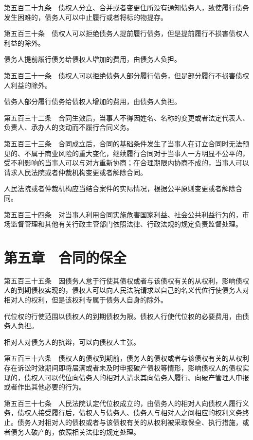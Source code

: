 \documentclass[UTF8,12pt,a4paper]{ctexbook}
\begin{document}
第五百二十九条　债权人分立、合并或者变更住所没有通知债务人，致使履行债务发生困难的，债务人可以中止履行或者将标的物提存。

第五百三十条　债权人可以拒绝债务人提前履行债务，但是提前履行不损害债权人利益的除外。

债务人提前履行债务给债权人增加的费用，由债务人负担。

第五百三十一条　债权人可以拒绝债务人部分履行债务，但是部分履行不损害债权人利益的除外。

债务人部分履行债务给债权人增加的费用，由债务人负担。

第五百三十二条　合同生效后，当事人不得因姓名、名称的变更或者法定代表人、负责人、承办人的变动而不履行合同义务。

第五百三十三条　合同成立后，合同的基础条件发生了当事人在订立合同时无法预见的、不属于商业风险的重大变化，继续履行合同对于当事人一方明显不公平的，受不利影响的当事人可以与对方重新协商；在合理期限内协商不成的，当事人可以请求人民法院或者仲裁机构变更或者解除合同。

人民法院或者仲裁机构应当结合案件的实际情况，根据公平原则变更或者解除合同。

第五百三十四条　对当事人利用合同实施危害国家利益、社会公共利益行为的，市场监督管理和其他有关行政主管部门依照法律、行政法规的规定负责监督处理。

\section*{第五章　合同的保全}

第五百三十五条　因债务人怠于行使其债权或者与该债权有关的从权利，影响债权人的到期债权实现的，债权人可以向人民法院请求以自己的名义代位行使债务人对相对人的权利，但是该权利专属于债务人自身的除外。

代位权的行使范围以债权人的到期债权为限。债权人行使代位权的必要费用，由债务人负担。

相对人对债务人的抗辩，可以向债权人主张。

第五百三十六条　债权人的债权到期前，债务人的债权或者与该债权有关的从权利存在诉讼时效期间即将届满或者未及时申报破产债权等情形，影响债权人的债权实现的，债权人可以代位向债务人的相对人请求其向债务人履行、向破产管理人申报或者作出其他必要的行为。

第五百三十七条　人民法院认定代位权成立的，由债务人的相对人向债权人履行义务，债权人接受履行后，债权人与债务人、债务人与相对人之间相应的权利义务终止。债务人对相对人的债权或者与该债权有关的从权利被采取保全、执行措施，或者债务人破产的，依照相关法律的规定处理。
\end{document}

